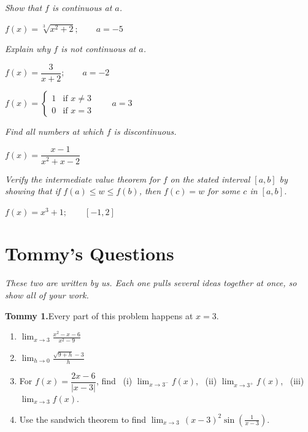 \documentclass[11pt]{article}
\newcommand{\wsS}{\vspace*{3cm}}    %
\newcommand{\wsM}{\vspace*{4.5cm}}  %
\newcommand{\wsL}{\vspace*{6.5cm}}  %
\newcommand{\prob}[1]{\item[\textbf{#1.}]}
\newcommand{\headnote}[1]{\smallskip\noindent\textit{#1}\par\nopagebreak}
\begin{document}
\headnote{Show that $f$ is continuous at $a$.}
\begin{probs}
  \prob{28} $f(x)=\sqrt[3]{x^{2}+2};\qquad a=-5$ \wsM
\end{probs}

\headnote{Explain why $f$ is not continuous at $a$.}
\begin{probs}
  \prob{29} $f(x)=\dfrac{3}{x+2};\qquad a=-2$ \wsS
  \prob{30} $f(x)=\begin{cases}1 & \text{if } x\neq3\\ 0 & \text{if } x=3\end{cases}\qquad a=3$ \wsS
\end{probs}

\headnote{Find all numbers at which $f$ is discontinuous.}
\begin{probs}
  \prob{31} $f(x)=\dfrac{x-1}{x^{2}+x-2}$ \wsM
\end{probs}

\headnote{Verify the intermediate value theorem for $f$ on the stated interval $[a,b]$ by showing
that if $f(a)\le w\le f(b)$, then $f(c)=w$ for some $c$ in $[a,b]$.}
\begin{probs}
  \prob{32} $f(x)=x^{3}+1;\qquad [-1,2]$ \wsL
\end{probs}

\section*{Tommy's Questions}
\noindent\textit{These two are written by us. Each one pulls several ideas together at once,
so show all of your work.}
\medskip

\noindent\textbf{Tommy 1.}\quad Every part of this problem happens at $x=3$.
\begin{enumerate}[label=\textbf{(\alph*)},leftmargin=2.8em,itemsep=6pt,topsep=5pt]
  \item $\displaystyle\lim_{x\to3}\frac{x^{2}-x-6}{x^{2}-9}$ \wsM
  \item $\displaystyle\lim_{h\to0}\frac{\sqrt{9+h}-3}{h}$ \wsM
  \item For $f(x)=\dfrac{2x-6}{|x-3|}$, find
        \ (i) $\displaystyle\lim_{x\to3^{-}}f(x)$,
        \ (ii) $\displaystyle\lim_{x\to3^{+}}f(x)$,
        \ (iii) $\displaystyle\lim_{x\to3}f(x)$. \wsL
  \item Use the sandwich theorem to find
        $\displaystyle\lim_{x\to3}\,(x-3)^{2}\sin\!\left(\frac{1}{x-3}\right)$. \wsM
\end{enumerate}
\end{document}
